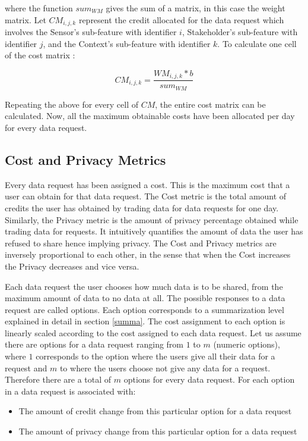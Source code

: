 where the function $sum_{WM}$ gives the sum of a matrix, in this case the weight matrix.
Let $CM_{i,j,k}$ represent the credit allocated for the data request which involves the Sensor's sub-feature with identifier $i$, Stakeholder's sub-feature with identifier $j$, and the Context's sub-feature with identifier $k$. To calculate one cell of the cost matrix :

\begin{equation}
CM_{i,j,k} = \frac{WM_{i,j,k} * b}{sum_{WM}}
\end{equation}

Repeating the above for every cell of $CM$, the entire cost matrix can be calculated. Now, all the maximum obtainable costs have been allocated per day for every data request.

\subsection{Cost and Privacy Metrics} \label{o}
Every data request has been assigned a cost. This is the maximum cost that a user can obtain for that data request.
The Cost metric is the total amount of credits the user has obtained by trading data for data requests for one day. Similarly, the Privacy metric is the amount of privacy percentage obtained while trading data for requests. It intuitively quantifies the amount of data the user has refused to share hence implying privacy. The Cost and Privacy metrics are inversely proportional to each other, in the sense that when the Cost increases the Privacy decreases and vice versa.

Each data request the user chooses how much data is to be shared, from the maximum amount of data to no data at all. The possible responses to a data request are called options. Each option corresponds to a summarization level explained in detail in section \ref{summa}. The cost assignment to each option is linearly scaled according
to the cost assigned to each data request. Let us assume there are options for a data request ranging from $1$ to $m$ (numeric options), where $1$ corresponds to the option where the users give all their data for a request and $m$ to where the users choose not give any data for a request. Therefore there are a total of $m$ options for every data request. For each option in a data request is associated with:

\begin{itemize}
\item The amount of credit change from this particular option for a data request
\item The amount of privacy change from this particular option for a data request
\end{itemize}

